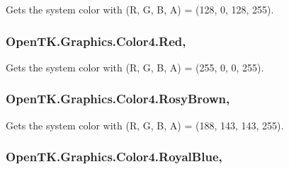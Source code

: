 Gets the system color with (R, G, B, A) = (128, 0, 128, 255). 

\hypertarget{struct_open_t_k_1_1_graphics_1_1_color4_a5dfbf9562182d6f453cbff687ddcada7}{
\subsubsection[{Red}]{ Open\-T\-K.\-Graphics.\-Color4.\-Red\hspace{0.3cm}{\ttfamily [static]}, {\ttfamily [get]}}}\label{struct_open_t_k_1_1_graphics_1_1_color4_a5dfbf9562182d6f453cbff687ddcada7}


Gets the system color with (R, G, B, A) = (255, 0, 0, 255). 

\hypertarget{struct_open_t_k_1_1_graphics_1_1_color4_a9e54c1a9710e6b60ae70a6556b5ddbf6}{
\subsubsection[{Rosy\-Brown}]{ Open\-T\-K.\-Graphics.\-Color4.\-Rosy\-Brown\hspace{0.3cm}{\ttfamily [static]}, {\ttfamily [get]}}}\label{struct_open_t_k_1_1_graphics_1_1_color4_a9e54c1a9710e6b60ae70a6556b5ddbf6}


Gets the system color with (R, G, B, A) = (188, 143, 143, 255). 

\hypertarget{struct_open_t_k_1_1_graphics_1_1_color4_a999d1be63fb1025ffb95d4caff23125f}{
\subsubsection[{Royal\-Blue}]{ Open\-T\-K.\-Graphics.\-Color4.\-Royal\-Blue\hspace{0.3cm}{\ttfamily [static]}, {\ttfamily [get]}}}\label{struct_open_t_k_1_1_graphics_1_1_color4_a999d1be63fb1025ffb95d4caff23125f}


